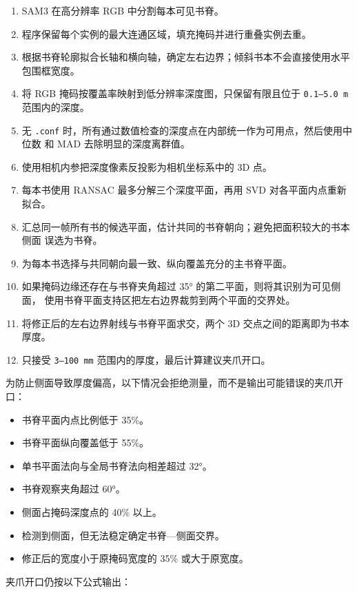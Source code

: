 \documentclass[
  chinese,
  11pt,
  a4paper,
]{article}
\providecommand{\tightlist}{%
  \setlength{\itemsep}{0pt}\setlength{\parskip}{0pt}}
\begin{document}
\begin{enumerate}
\def\labelenumi{\arabic{enumi}.}
\tightlist
\item
  SAM3 在高分辨率 RGB 中分割每本可见书脊。
\item
  程序保留每个实例的最大连通区域，填充掩码并进行重叠实例去重。
\item
  根据书脊轮廓拟合长轴和横向轴，确定左右边界；倾斜书本不会直接使用水平包围框宽度。
\item
  将 RGB 掩码按覆盖率映射到低分辨率深度图，只保留有限且位于
  \texttt{0.1–5.0\ m} 范围内的深度。
\item
  无 \texttt{.conf}
  时，所有通过数值检查的深度点在内部统一作为可用点，然后使用中位数 和
  MAD 去除明显的深度离群值。
\item
  使用相机内参把深度像素反投影为相机坐标系中的 3D 点。
\item
  每本书使用 RANSAC 最多分解三个深度平面，再用 SVD
  对各平面内点重新拟合。
\item
  汇总同一帧所有书的候选平面，估计共同的书脊朝向；避免把面积较大的书本侧面
  误选为书脊。
\item
  为每本书选择与共同朝向最一致、纵向覆盖充分的主书脊平面。
\item
  如果掩码边缘还存在与书脊夹角超过 35°
  的第二平面，则将其识别为可见侧面，
  使用书脊平面支持区把左右边界裁剪到两个平面的交界处。
\item
  将修正后的左右边界射线与书脊平面求交，两个 3D
  交点之间的距离即为书本厚度。
\item
  只接受 \texttt{3–100\ mm} 范围内的厚度，最后计算建议夹爪开口。
\end{enumerate}

为防止侧面导致厚度偏高，以下情况会拒绝测量，而不是输出可能错误的夹爪开口：

\begin{itemize}
\tightlist
\item
  书脊平面内点比例低于 35\%。
\item
  书脊平面纵向覆盖低于 55\%。
\item
  单书平面法向与全局书脊法向相差超过 32°。
\item
  书脊观察夹角超过 60°。
\item
  侧面占掩码深度点的 40\% 以上。
\item
  检测到侧面，但无法稳定确定书脊---侧面交界。
\item
  修正后的宽度小于原掩码宽度的 35\% 或大于原宽度。
\end{itemize}

夹爪开口仍按以下公式输出：
\end{document}

